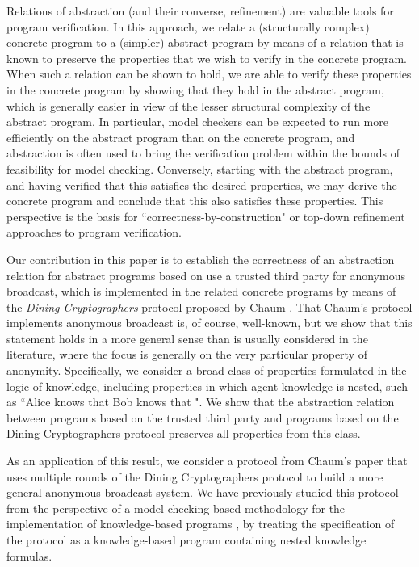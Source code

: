 \documentclass[]{llncs}
\begin{document}
Relations of abstraction (and their converse, refinement) 
are valuable tools for program verification. In this approach, 
we relate a (structurally complex) concrete program to a (simpler) abstract program
by means of a relation that is known to preserve the properties that we wish to verify 
in the concrete program. When such a relation can be shown to hold, 
we are able to verify these properties in the concrete program by 
showing that they hold in the abstract program, which is 
generally easier in view of the lesser structural complexity of the 
abstract program. In particular, model checkers can be expected to 
run more efficiently on the abstract program than on the concrete program, 
and abstraction is often used to bring the verification problem within the 
bounds of feasibility  for model checking. 
Conversely, starting with the abstract program, and 
having verified that this satisfies the desired properties, 
we may derive the concrete program and conclude that this also satisfies 
these properties. This perspective is the basis for ``correctness-by-construction" or top-down refinement 
approaches to program verification.  

Our contribution in this paper is to establish the correctness of an abstraction relation 
for abstract programs based on use a trusted third party for anonymous broadcast, 
which is implemented in the related concrete programs by means of the {\em Dining Cryptographers} protocol 
proposed by Chaum \cite{chaum}. That Chaum's  protocol implements anonymous 
broadcast is, of course, well-known, but we show that this statement holds in a more
general sense than is usually considered in the literature, where the focus is generally on the very particular property of anonymity. 
Specifically, we consider a broad class of properties formulated in the logic of knowledge, including properties in which agent knowledge is nested, 
such as ``Alice knows that Bob knows that ". We show that the abstraction relation 
between programs based on the trusted third party and programs based on 
the Dining Cryptographers protocol preserves all properties from this class. 

As an application of this result, we consider a protocol from Chaum's paper \cite{chaum} 
that uses multiple rounds of the Dining Cryptographers protocol to build a more general 
anonymous broadcast system. We have previously studied this protocol from the 
perspective of  a model checking based methodology for the implementation of 
knowledge-based programs \cite{AlBatainehMeyden10}, by treating the specification of the 
protocol as a knowledge-based program containing nested knowledge formulas. 
\end{document}
